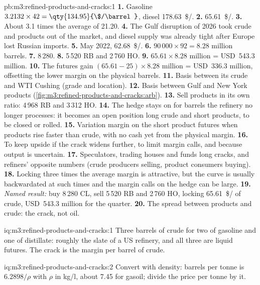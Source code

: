 \begin{solution}{pb:m3:refined-products-and-cracks:1}
\textbf{1.} Gasoline $3.2132 \times 42 = \qty{134.95}{\$/\barrel}$, diesel
\qty{178.63}{\$/\barrel}. \textbf{2.} \qty{65.61}{\$/\barrel}. \textbf{3.} About 3.1 times
the average of \qty{21.20}{}. \textbf{4.} The Gulf disruption of 2026 took crude and
products out of the market, and diesel supply was already tight after Europe lost
Russian imports. \textbf{5.} May 2022, \qty{62.68}{\$/\barrel}.
\textbf{6.} $90\,000 \times 92 = 8.28$ million barrels. \textbf{7.} 8\,280. \textbf{8.}
5\,520 RB and 2\,760 HO. \textbf{9.} $65.61 \times 8.28$ million = USD~543.3 million.
\textbf{10.} The futures gain $(65.61 - 25) \times 8.28$ million = USD~336.3 million,
offsetting the lower margin on the physical barrels.
\textbf{11.} Basis between its crude and WTI Cushing (grade and location). \textbf{12.}
Basis between Gulf and New York products (\cref{fig:m3:refined-products-and-cracks:arb}).
\textbf{13.} Sell products in its own ratio: 4\,968 RB and 3\,312 HO. \textbf{14.} The
hedge stays on for barrels the refinery no longer processes: it becomes an open position
long crude and short products, to be closed or rolled. \textbf{15.} Variation margin on
the short product futures when products rise faster than crude, with no cash yet from
the physical margin. \textbf{16.} To keep upside if the crack widens further, to limit
margin calls, and because output is uncertain. \textbf{17.} Speculators, trading houses
and funds long cracks, and refiners' opposite numbers (crude producers selling, product
consumers buying). \textbf{18.} Locking three times the average margin is attractive, but
the curve is usually backwardated at such times and the margin calls on the hedge can be
large. \textbf{19.} \emph{Named result:} buy 8\,280 CL, sell 5\,520 RB and 2\,760 HO,
locking \qty{65.61}{\$/\barrel} of crude, USD~543.3 million for the quarter. \textbf{20.}
The spread between products and crude: the crack, not oil.
\end{solution}

\begin{solution}{iq:m3:refined-products-and-cracks:1}
Three barrels of crude for two of gasoline and one of distillate: roughly the slate of a
US refinery, and all three are liquid futures. The crack is the margin per barrel of
crude.
\end{solution}

\begin{solution}{iq:m3:refined-products-and-cracks:2}
Convert with density: barrels per tonne is $6.2898/\rho$ with $\rho$ in kg/l, about 7.45
for gasoil; divide the price per tonne by it.
\end{solution}

